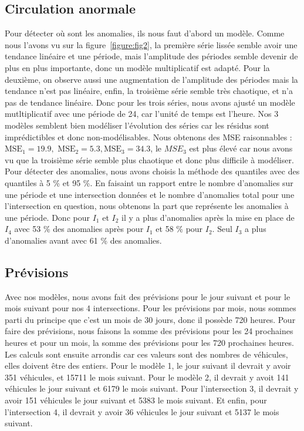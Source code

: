 \documentclass[titlepage]{article}
\begin{document}
\subsection{Circulation anormale}

Pour détecter où sont les anomalies, ils nous faut d'abord un modèle. Comme nous l'avons vu sur la figure~\ref{figure:fig2}, la première
série lissée semble avoir une tendance linéaire et une période, mais l'amplitude des périodes semble devenir de plus en plus importante, donc
un modèle multiplicatif est adapté. Pour la deuxième, on observe aussi une augmentation de l'amplitude des périodes mais la tendance n'est
pas linéaire, enfin, la troisième série semble très chaotique, et n'a pas de tendance linéaire. Donc pour les trois séries, nous avons ajusté un
modèle mutltiplicatif avec une période de 24, car l'unité de temps est l'heure. Nos 3 modèles semblent bien modéliser l'évolution des séries
car les résidus sont imprédictibles et donc non-modélisables. Nous obtenons des MSE raisonnables : $\text{MSE}_1 = 19.9,\text{ MSE}_2 = 5.3, \text{MSE}_3 = 34.3$,
le $MSE_3$ est plus élevé car nous avons vu que la troisième série semble plus chaotique et donc plus difficile à modéliser.\\

Pour détecter des anomalies, nous avons choisis la méthode des quantiles avec des quantiles à 5 \% et 95 \%. En faisaint un rapport entre le
nombre d'anomalies sur une période et une intersection données et le nombre d'anomalies total pour une l'intersection en question, nous obtenons
la part que représente les anomalies à une période. Donc pour $I_1$ et $I_2$ il y a plus d'anomalies après la mise en place de $I_4$ avec 53 \% des
anomalies après pour $I_1$ et 58 \% pour $I_2$. Seul $I_3$ a plus d'anomalies avant avec 61 \% des anomalies.

\subsection{Prévisions}

Avec nos modèles, nous avons fait des prévisions pour le jour suivant et pour le mois suivant pour nos 4 intersections. Pour les prévisions par mois,
nous sommes parti du principe que c'est un mois de 30 jours, donc il possède 720 heures. Pour faire des prévisions, nous faisons la somme des prévisions
pour les 24 prochaines heures et pour un mois, la somme des prévisions pour les 720 prochaines heures. Les calculs sont ensuite arrondis car ces valeurs
sont des nombres de véhicules, elles doivent être des entiers. Pour le modèle 1, le jour suivant il devrait y avoir 351 véhicules, et 15711 le mois suivant.
Pour le modèle 2, il devrait y avoit 141 véhicules le jour suivant et 6179 le mois suivant. Pour l'intersection 3, il devrait y avoir 151 véhicules le jour suivant
et 5383 le mois suivant. Et enfin, pour l'intersection 4, il devrait y avoir 36 véhicules le jour suivant et 5137 le mois suivant.
\end{document}
